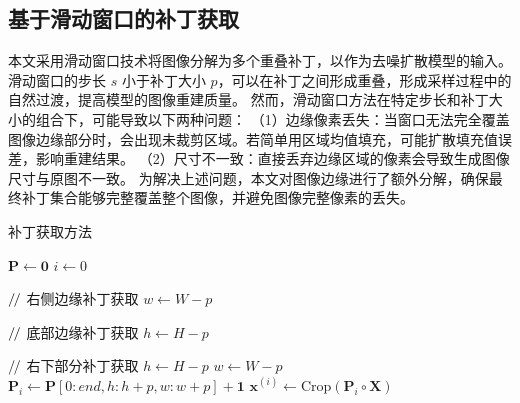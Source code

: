 \subsection{基于滑动窗口的补丁获取}
本文采用滑动窗口技术将图像分解为多个重叠补丁，以作为去噪扩散模型的输入。
滑动窗口的步长 $s$ 小于补丁大小 $p$，可以在补丁之间形成重叠，形成采样过程中的自然过渡，提高模型的图像重建质量。
然而，滑动窗口方法在特定步长和补丁大小的组合下，可能导致以下两种问题：
（1）边缘像素丢失：当窗口无法完全覆盖图像边缘部分时，会出现未裁剪区域。若简单用区域均值填充，可能扩散填充值误差，影响重建结果。
（2）尺寸不一致：直接丢弃边缘区域的像素会导致生成图像尺寸与原图不一致。
为解决上述问题，本文对图像边缘进行了额外分解，确保最终补丁集合能够完整覆盖整个图像，并避免图像完整像素的丢失。
\begin{algorithm}[ht]
\caption{补丁获取方法}
\label{alg:patch}


$\bm{P} \gets \mathbf{0}$ 
$i \gets 0$\; 


$\mathbin{/\mkern-2mu/}$ 右侧边缘补丁获取\;
$w \gets W - p$\;


$\mathbin{/\mkern-2mu/}$ 底部边缘补丁获取\;
$h \gets H - p$\;


$\mathbin{/\mkern-2mu/}$ 右下部分补丁获取\;
$h \gets H - p$\;
$w \gets W - p$\;
$\bm{P}_i \gets \bm{P}[0:end, h:h + p, w:w + p] + \mathbf{1}$\;
$\mathbf{x}^{(i)} \gets \text{Crop}(\bm{P}_i \circ \bm{X})$\;
\end{algorithm}

